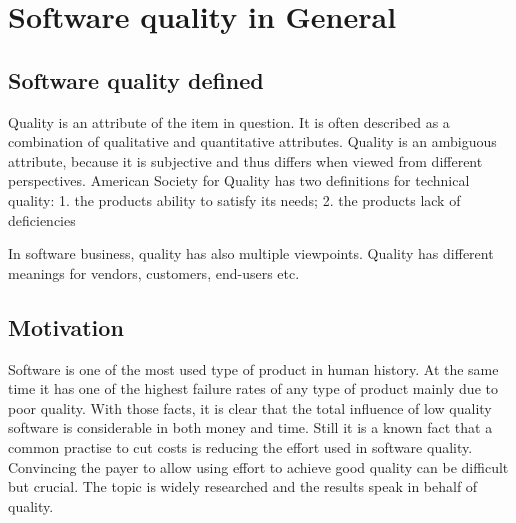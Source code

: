 \section{Software quality in General}
 
\subsection{Software quality defined}

Quality is an attribute of the item in question. It is often described as a combination of qualitative and quantitative attributes. Quality is an ambiguous attribute, because it is subjective and thus differs when viewed from different perspectives. American Society for Quality has two definitions for technical quality: 1. the products ability to satisfy its needs; 2. the products lack of deficiencies~\cite{ASQglossary}

In software business, quality has also multiple viewpoints. Quality has different meanings for vendors, customers, end-users etc. 

 





\subsection{Motivation}

Software is one of the most used type of product in human history. At the same time it has one of the highest failure rates of any type of product mainly due to poor quality. With those facts, it is clear that the total influence of low quality software is considerable in both money and time. Still it is a known fact that a common practise to cut costs is reducing the effort used in software quality. Convincing the payer to allow using effort to achieve good quality can be difficult but crucial. The topic is widely researched and the results speak in behalf of quality.

